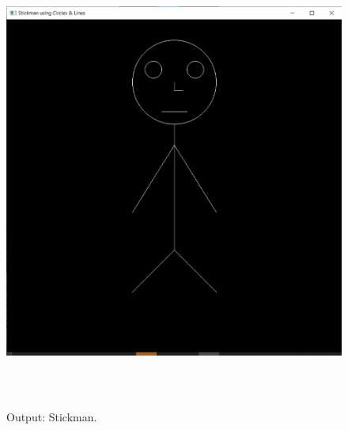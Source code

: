 \documentclass[12pt, a4]{article}
\begin{document}
\subsection*{}
\begin{figure}[h]
\centering
\caption{Output: Stickman.}
\includegraphics[height=15cm, width=15cm]{Hangman/Outputs/Stickman.png}
\end{figure}



\newpage
\end{document}
